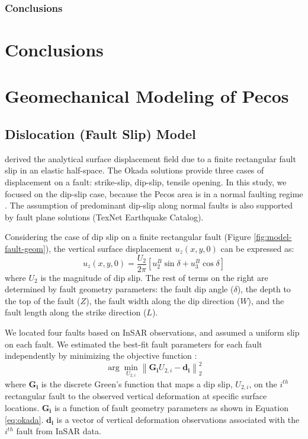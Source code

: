 \documentclass{utexasthesis}
\begin{document}
\subsection{Conclusions}


\chapter{Conclusions}

\pagebreak




\appendix


\chapter{Geomechanical Modeling of Pecos}


\section{Dislocation (Fault Slip) Model}
\label{appen:okada}
\cite{Okada1992InternalDeformationDue} derived the analytical surface displacement field due to a finite rectangular fault slip in an elastic half-space. The Okada solutions provide three cases of displacement on a fault: strike-slip, dip-slip, tensile opening. In this study, we focused on the dip-slip case, because the Pecos area is in a normal faulting regime \cite{LundSnee2018}.  The assumption of predominant dip-slip along normal faults is also supported by fault plane solutions (TexNet Earthquake Catalog). 

Considering the case of dip slip on a finite rectangular fault (Figure \ref{fig:model-fault-geom}), the vertical surface displacement $u_z(x, y, 0)$ can be expressed as:
\begin{equation}
	u_{z}(x,y,0)=\frac{U_{2}}{2\pi }[u_{2}^{B}\sin \delta + u_{3}^{B}\cos \delta]
	\label{eq:okada}
\end{equation}
where $U_2$ is the magnitude of dip slip. The rest of terms on the right are determined by fault geometry parameters: the fault dip angle ($\delta$), the depth to the top of the fault ($Z$), the fault width along the dip direction ($W$), and the fault length along the strike direction ($L$). 

We located four faults based on InSAR observations, and assumed a uniform slip on each fault. We estimated the best-fit fault parameters for each fault independently by minimizing the objective function \cite{Du1992}:
\begin{equation}
	\arg \min_{U_{2,i}} \left \| \mathbf{G_i}U_{2,i}-\mathbf{d_i} \right \|^2_{2}  
	\label{eq:model-obj-1}
\end{equation}	  	
where $\mathbf{G_i}$ is the discrete Green’s function that maps a dip slip, $U_{2,i}$, on the $i^{th}$ rectangular fault to the observed vertical deformation at specific surface locations.  $\mathbf{G_i}$ is a function of fault geometry parameters as shown in Equation \eqref{eq:okada}. $\mathbf{d_i}$ is a vector of vertical deformation observations associated with the $i^{th}$ fault from InSAR data.
\end{document}
